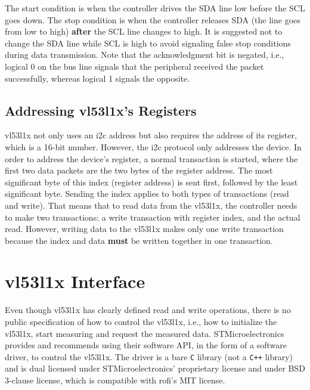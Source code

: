 \documentclass[
  digital,     %
  oneside,     %
  nosansbold,  %
  nocolorbold, %
  nolof,         %
  nolot,         %
]{fithesis4}
\begin{document}
The start condition is when the controller drives the SDA line low before the SCL goes down. The
stop condition is when the controller releases SDA (the line goes from low to high) \textbf{after}
the SCL line changes to high. It is suggested not to change the SDA line while SCL is high to avoid
signaling false stop conditions during data transmission. Note that the acknowledgment bit is
negated, i.e., logical 0 on the bus line signals that the peripheral received the packet
successfully, whereas logical 1 signals the opposite.


\subsection[ Addressing VL53L1X's Registers ]{ Addressing \gls{vl53l1x}'s Registers } \label{sec:lidar-i2c} 

\gls{vl53l1x} not only uses an \acrshort{i2c} address but also requires the address of its register,
which is a 16-bit number. However, the \acrshort{i2c} protocol only addresses the device. In order
to address the device's register, a normal transaction is started, where the first two data packets
are the two bytes of the register address. The most significant byte of this index (register
address) is sent first, followed by the least significant byte. Sending the index applies to both
types of transactions (read and write). That means that to read data from the \gls{vl53l1x}, the
controller needs to make two transactions: a write transaction with register index, and the actual
read. However, writing data to the \gls{vl53l1x} makes only one write transaction because the index
and data \textbf{must} be written together in one transaction.

\section[VL53L1X Interface ]{ \gls{vl53l1x} Interface }

Even though \gls{vl53l1x} has clearly defined read and write operations, there is no public
specification of how to control the \gls{vl53l1x}, i.e., how to initialize the \gls{vl53l1x}, start
measuring and request the measured data. STMicroelectronics provides and recommends using their
software API, in the form of a software driver, to control the \gls{vl53l1x}. The driver is a bare
\verb|C| library (not a \verb|C++| library) and is dual licensed under STMicroelectronics'
proprietary license and under BSD 3-clause license, which is compatible with \acrshort{rofi}'s MIT
license.
\end{document}
